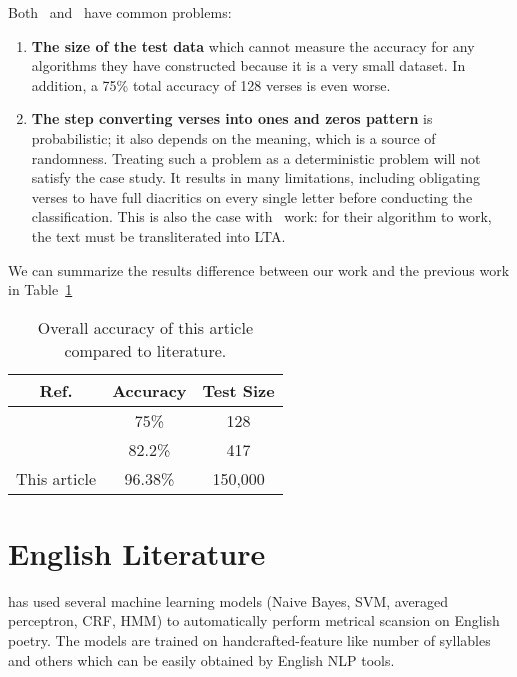 Both~\cite{Abuata2016RuleBasedAlgorithm} and~\cite{Alnagdawi2013FindingArabicPoemMeter} have common problems:

\begin{enumerate}
\item \textbf{The size of the test data} which cannot measure the accuracy for any algorithms they have constructed because it is a very small dataset. In addition, a 75\% total accuracy of 128 verses is even worse.
\item \textbf{The step converting verses into ones and zeros pattern} is probabilistic; it also depends on the meaning, which is a source of randomness. Treating such a problem as a deterministic problem will not satisfy the case study. It results in many limitations, including obligating verses to have full diacritics on every single letter before conducting the classification. This is also the case with~\cite{Kurt2012AlgorithmForDetectionAnalysis} work: for their algorithm to work, the text must be transliterated into LTA.
\end{enumerate}

We can summarize the results difference between our work and the previous work in Table~\ref{Tab:Summary_Results}

\begin{table}[h]
\centering
\begin{tabular}{c c c}
\toprule
\textbf{Ref.}& \textbf{Accuracy}& \textbf{Test Size} \\
\midrule
\cite{Alnagdawi2013FindingArabicPoemMeter} & 75\% & 128\\
\cite{Abuata2016RuleBasedAlgorithm}& 82.2\% & 417\\
This article & 96.38\%& 150,000 \\
\bottomrule
\end{tabular}
\caption{Overall accuracy of this article compared to literature.}\label{Tab:Summary_Results}
\end{table}


\section{English Literature}

\cite{Agirrezabal2016MachineLearningMetricalAnalysis} has used several machine learning models
(Naive Bayes, SVM, averaged perceptron, CRF, HMM) to automatically perform metrical scansion on
English poetry.  The models are trained on handcrafted-feature like number of syllables and others
which can be easily obtained by English NLP tools.

